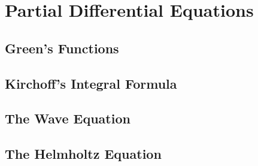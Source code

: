 \section{Partial Differential Equations}
    \subsection{Green's Functions}
    \subsection{Kirchoff's Integral Formula}
    \subsection{The Wave Equation}
    \subsection{The Helmholtz Equation}
